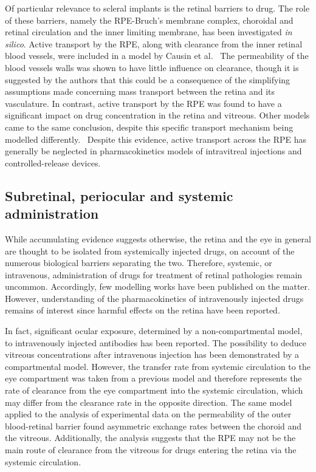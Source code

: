 \documentclass[12pt,a4paper]{journal}
\begin{document}
Of particular relevance to scleral implants is the retinal barriers to drug.
The role of these barriers, namely the RPE-Bruch's membrane complex, choroidal and retinal circulation and the inner limiting membrane, has been investigated \textit{in silico}.
Active transport by the RPE, along with clearance from the inner retinal blood vessels, were included in a model by Causin et al.~\cite{Causin_2016}
The permeability of the blood vessels walls was shown to have little influence on clearance, though it is suggested by the authors that this could be a consequence of the simplifying assumptions made concerning mass transport between the retina and its vasculature.
In contrast, active transport by the RPE was found to have a significant impact on drug concentration in the retina and vitreous.
Other models came to the same conclusion, despite this specific transport mechanism being modelled differently.~\cite{Balachandran_2008,Kotha_2014}
Despite this evidence, active transport across the RPE has generally be neglected in pharmacokinetics models of intravitreal injections and controlled-release devices.


\subsection*{Subretinal, periocular and systemic administration}

While accumulating evidence suggests otherwise, the retina and the eye in general are thought to be isolated from systemically injected drugs, on account of the numerous biological barriers separating the two.
Therefore, systemic, or intravenous, administration of drugs for treatment of retinal pathologies remain uncommon.
Accordingly, few modelling works have been published on the matter.
However, understanding of the pharmacokinetics of intravenously injected drugs remains of interest since harmful effects on the retina have been reported.\cite{Fu_2017}

In fact, significant ocular exposure, determined by a non-compartmental model, to intravenously injected antibodies has been reported.\cite{Shivva_2021}
The possibility to deduce vitreous concentrations after intravenous injection has been demonstrated by a compartmental model.\cite{Vellonen_2015}
However, the transfer rate from systemic circulation to the eye compartment was taken from a previous model and therefore represents the rate of clearance from the eye compartment into the systemic circulation, which may differ from the clearance rate in the opposite direction.
The same model applied to the analysis of experimental data on the permeability of the outer blood-retinal barrier found asymmetric exchange rates between the choroid and the vitreous.\cite{Ramsay_2019}
Additionally, the analysis suggests that the RPE may not be the main route of clearance from the vitreous for drugs entering the retina via the systemic circulation.\cite{Ramsay_2019}
\end{document}
